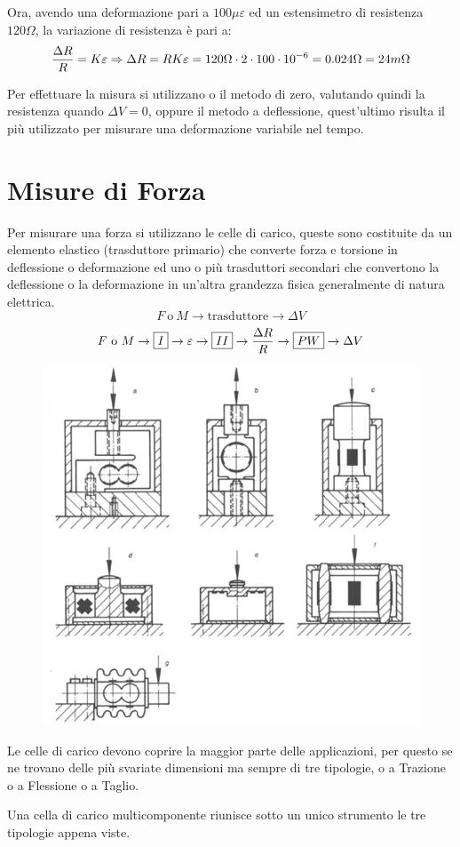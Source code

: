 \documentclass[a4paper, 15pt]{article}
\begin{document}
\begin{adjustwidth}{2in}{}
		 Ora, avendo una deformazione pari a $100\mu\varepsilon$ ed un estensimetro di resistenza $120\Omega$, la variazione di resistenza è pari a: 
		 \[{\Delta R\over R} = K\varepsilon \Rightarrow \Delta R = RK\varepsilon = 120\Omega \cdot 2 \cdot 100\cdot10^{-6} = 0.024\Omega = 24m\Omega\]
		 
		 Per effettuare la misura si utilizzano o il metodo di zero, valutando quindi la resistenza quando $\Delta V=0$, oppure il metodo a deflessione, quest'ultimo risulta il più utilizzato per misurare una deformazione variabile nel tempo.  
\end{adjustwidth}
\newpage
\section{Misure di Forza}		
\begin{adjustwidth}{2in}{}	 
		 Per misurare una forza si utilizzano le celle di carico, queste sono costituite da un elemento elastico (trasduttore primario) che converte forza e torsione in deflessione o deformazione ed uno o più trasduttori secondari che convertono la deflessione o la deformazione in un'altra grandezza fisica generalmente di natura elettrica.
		 \[F~\text{o}~M\rightarrow\boxed{\text{trasduttore}}\rightarrow\Delta V\]
		 \[F~\text{o}~M\rightarrow\boxed{I}\rightarrow\varepsilon\rightarrow\boxed{II}\rightarrow{\Delta R\over R}\rightarrow\boxed{PW}\rightarrow\Delta V\]
\begin{figure}[H]
	\centering
	\includegraphics[width=0.5\linewidth]{immagini/9}
	\label{fig:9}
\end{figure}
		 Le celle di carico devono coprire la maggior parte delle applicazioni, per questo se ne trovano delle più svariate dimensioni ma sempre di tre tipologie, o a Trazione o a Flessione o a Taglio.
		 
		 Una cella di carico multicomponente riunisce sotto un unico strumento le tre tipologie appena viste. 
\end{adjustwidth}
\end{document}
